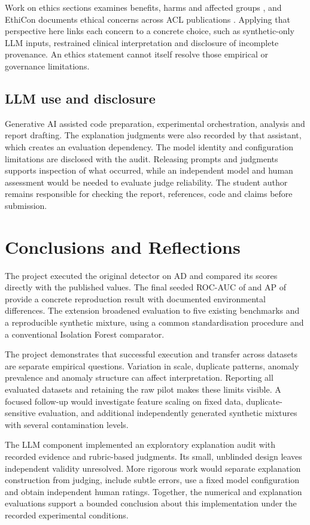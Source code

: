 \documentclass[11pt]{article}
\begin{document}
Work on ethics sections examines benefits, harms and affected groups \citep{benotti2022ethics}, and EthiCon documents ethical concerns across ACL publications \citep{karamolegkou2025ethicon}. Applying that perspective here links each concern to a concrete choice, such as synthetic-only LLM inputs, restrained clinical interpretation and disclosure of incomplete provenance. An ethics statement cannot itself resolve those empirical or governance limitations.

\subsection{LLM use and disclosure}
Generative AI assisted code preparation, experimental orchestration, analysis and report drafting. The explanation judgments were also recorded by that assistant, which creates an evaluation dependency. The model identity and configuration limitations are disclosed with the audit. Releasing prompts and judgments supports inspection of what occurred, while an independent model and human assessment would be needed to evaluate judge reliability. The student author remains responsible for checking the report, references, code and claims before submission.

\section{Conclusions and Reflections}
The project executed the original detector on AD and compared its scores directly with the published values. The final seeded ROC-AUC of \adAuc{} and AP of \adAp{} provide a concrete reproduction result with documented environmental differences. The extension broadened evaluation to five existing benchmarks and a reproducible synthetic mixture, using a common standardisation procedure and a conventional Isolation Forest comparator.

The project demonstrates that successful execution and transfer across datasets are separate empirical questions. Variation in scale, duplicate patterns, anomaly prevalence and anomaly structure can affect interpretation. Reporting all evaluated datasets and retaining the raw pilot makes these limits visible. A focused follow-up would investigate feature scaling on fixed data, duplicate-sensitive evaluation, and additional independently generated synthetic mixtures with several contamination levels.

The LLM component implemented an exploratory explanation audit with recorded evidence and rubric-based judgments. Its small, unblinded design leaves independent validity unresolved. More rigorous work would separate explanation construction from judging, include subtle errors, use a fixed model configuration and obtain independent human ratings. Together, the numerical and explanation evaluations support a bounded conclusion about this implementation under the recorded experimental conditions.
\end{document}
